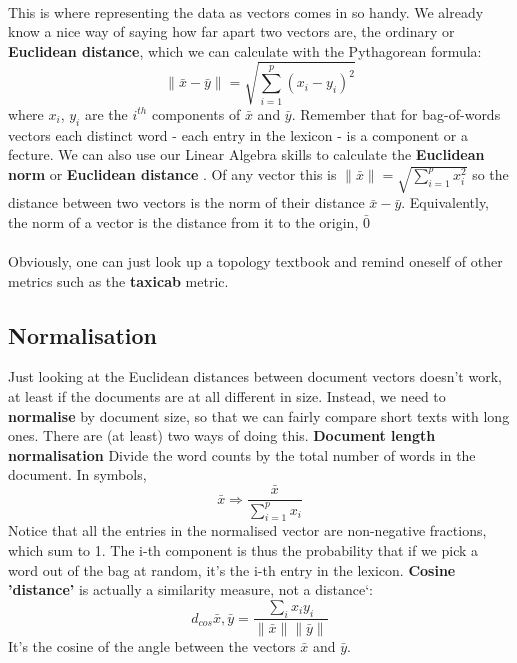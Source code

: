 \documentclass[a4paper,10pt]{article}
\begin{document}
\paragraph{}
      This is where representing the data as vectors comes in so handy. We already know a nice way of saying how far apart two vectors
are, the ordinary or \textbf{Euclidean distance}, which we can calculate with the Pythagorean formula:
$$\|\bar{x} - \bar{y}\| = \sqrt{\sum_{i=1}^{p}(x_i - y_i)^2}$$
where $x_i$, $y_i$ are the $i^{th}$ components of $\bar{x}$ and $\bar{y}$. Remember that for bag-of-words vectors 
each distinct word - each entry in the lexicon - is a component or a fecture. 
   We can also use our Linear Algebra skills to calculate the \textbf{Euclidean norm} or \textbf{Euclidean distance}
. Of any vector this is 
$\|\bar{x}\| = \sqrt{\sum_{i=1}^{p}x^{2}_{i}}$
so the distance between two vectors is the norm of their distance $\bar{x} - \bar{y}$. Equivalently, the norm of a
vector is the distance from it to the origin, $\bar{0}$
   \paragraph{} Obviously, one can just look up a topology textbook and remind oneself of
other metrics such as the \textbf{taxicab} metric. 
\subsection{Normalisation}
  Just looking at the Euclidean distances between document vectors doesn't work, at least if the documents 
are at all different in size. Instead, we need to \textbf{normalise} by document size, so that we can fairly
compare short texts with long ones. There are (at least) two ways of doing this.
\newline
\textbf{Document length normalisation} Divide the word counts by the total number of words in the document. In 
symbols, 
\begin{equation} \bar{x} \Rightarrow \frac{\bar{x}}{\sum_{i=1}^{p} x_{i}}\end{equation}
Notice that all the entries in the normalised vector are non-negative fractions, which sum to 1. The i-th component
is thus the probability that if we pick a word out of the bag at random, it's the i-th entry in the lexicon.
\newline
\textbf{Cosine 'distance'} is actually a similarity measure, not a distance`:
\begin{equation}
 d_{cos} \bar{x}, \bar{y} = \frac{\sum_{i} x_{i}y_{i}}{\|\bar{x}\|\|\bar{y}\|}
\end{equation}
It's the cosine of the angle between the vectors $\bar{x}$ and $\bar{y}$.
\end{document}
